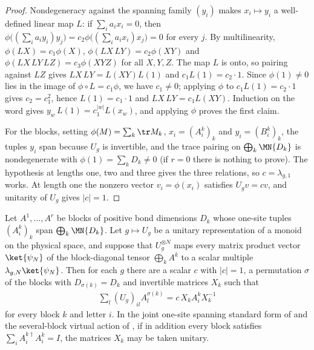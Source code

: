 \begin{proof}
    \leanok
    Nondegeneracy against the spanning family $(y_i)$ makes $x_i\mapsto y_i$
    a well-defined linear map $L$: if $\sum_ia_ix_i=0$, then
    $\phi\bigl((\sum_ia_iy_i)y_j\bigr)=c_2\phi\bigl((\sum_ia_ix_i)x_j\bigr)=0$
    for every $j$. By multilinearity,
    $\phi(LX)=c_1\phi(X)$, $\phi(LX\,LY)=c_2\phi(XY)$ and
    $\phi(LX\,LY\,LZ)=c_3\phi(XYZ)$ for all $X,Y,Z$. The map $L$ is onto, so
    pairing against $LZ$ gives $LX\,LY=L(XY)L(1)$ and $c_1L(1)=c_2\cdot1$.
    Since $\phi(1)\neq0$ lies in the image of $\phi\circ L=c_1\phi$, we have
    $c_1\neq0$; applying $\phi$ to $c_1L(1)=c_2\cdot1$ gives $c_2=c_1^2$,
    hence $L(1)=c_1\cdot1$ and $LX\,LY=c_1L(XY)$. Induction on the word
    gives $y_w\,L(1)=c_1^{|w|}L(x_w)$, and applying $\phi$ proves the first
    claim.

    For the blocks, setting $\phi(M)=\sum_k\tr M_k$, $x_i=(A^k_i)_k$ and
    $y_i=(B^k_i)_k$, the tuples $y_i$ span because $U_g$ is invertible, and
    the trace pairing on $\bigoplus_k\MN{D_k}$ is nondegenerate with
    $\phi(1)=\sum_kD_k\neq0$ (if $r=0$ there is nothing to prove). The
    hypothesis at lengths one, two and three gives the three relations, so
    $c=\lambda_{g,1}$ works. At length one the nonzero vector
    $v_i=\phi(x_i)$ satisfies $U_gv=cv$, and unitarity of $U_g$ gives
    $|c|=1$.
\end{proof}

\begin{lemma}
    \label{thm:block_isometric_deformation_symmetry_permutation}
    \leanok
    Let $A^1,\dots,A^r$ be blocks of positive bond dimensions $D_k$ whose
    one-site tuples $(A^k_i)_k$ span $\bigoplus_k\MN{D_k}$. Let
    $g\mapsto U_g$ be a unitary representation of a monoid on the physical
    space, and suppose that $U_g^{\otimes N}$ maps every matrix product
    vector $\ket{\psi_N}$ of the block-diagonal tensor $\bigoplus_kA^k$ to a
    scalar multiple $\lambda_{g,N}\ket{\psi_N}$. Then for each $g$
    there are a scalar $c$ with $|c|=1$, a permutation $\sigma$ of the blocks
    with $D_{\sigma(k)}=D_k$ and invertible matrices $X_k$ such that
    \begin{align*}
        \sum_l(U_g)_{il}A^{\sigma(k)}_l=c\,X_kA^k_iX_k^{-1}
    \end{align*}
    for every block $k$ and letter $i$. In the joint one-site spanning
    standard form of \cite[lines~325--352]{Schuch2011Phases} and the
    several-block virtual action of \cite[lines~652--660]{Schuch2011Phases},
    if in addition every block satisfies $\sum_iA^{k\dagger}_iA^k_i=I$, the
    matrices $X_k$ may be taken unitary.
\end{lemma}

